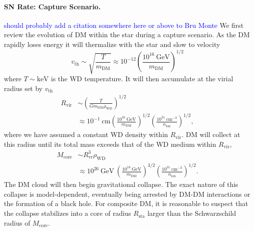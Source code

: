 \documentclass[preprintnumbers,amsmath,amssymb,prd, superscriptaddress,twocolumn]{revtex4}
\newcommand{\GeV}{\text{GeV}}
\newcommand{\keV}{\text{keV}}
\newcommand{\cm}{\text{cm}}
\def\r{\right)}
\def\l{\left(}
\begin{document}
\paragraph{SN Rate: Capture Scenario.}
\textcolor{blue}{should probably add a citation somewhere here or above to Bru Monte}
We first review the evolution of DM within the star during a capture scenario.
As the DM rapidly loses energy it will thermalize with the star and slow to velocity
\begin{equation}
v_\text{th} \sim \sqrt{\frac{T}{m_\text{DM}}} \approx 10^{-12} \l \frac{10^{16} ~\GeV}{m_\text{DM}}\r^{1/2}
\end{equation}
where $T \sim \keV$ is the WD temperature.
It will then accumulate at the virial radius set by $v_\text{th}$
\begin{align}
  R_\text{vir} &\sim \l \frac{T}{G m_\text{DM} \rho_\text{WD}}\r^{1/2} \\
  &\approx 10^{-1} ~\text{cm} \l \frac{10^{16} ~\GeV}{m_\text{DM}}\r^{1/2}
  \l \frac{10^{31} ~\cm^{-3}}{n_\text{ion}}\r^{1/2}, \nonumber
\end{align}
where we have assumed a constant WD density within $R_\text{vir}$.
DM will collect at this radius until its total mass exceeds that of the WD medium within $R_\text{vir}$,
\begin{align}
    M_\text{core} &\sim R^3_\text{vr} \rho_\text{WD} \\
    &\approx 10^{26}~\GeV ~\l \frac{10^{16} ~\GeV}{m_\text{DM}}\r^{3/2}
  \l \frac{10^{31} ~\cm^{-3}}{n_\text{ion}}\r^{1/2}. \nonumber
\end{align}
The DM cloud will then begin gravitational collapse.
The exact nature of this collapse is model-dependent, eventually being arrested by DM-DM interactions or the formation of a black hole.
For composite DM, it is reasonable to suspect that the collapse stabilizes into a core of radius $R_\text{sta}$ larger than the Schwarzschild radius of $M_\text{core}$.
\end{document}
